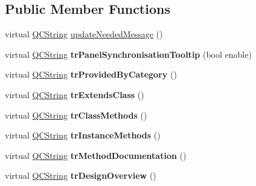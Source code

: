 \subsection*{Public Member Functions}
\begin{DoxyCompactItemize}
\item 
virtual \mbox{\hyperlink{class_q_c_string}{Q\+C\+String}} \mbox{\hyperlink{class_translator_adapter__1__8__2_a307747456f69ab8dcb0c2be27f429e80}{update\+Needed\+Message}} ()
\item 
\mbox{\label{class_translator_adapter__1__8__2_a13608bc1163641d721587d398924f09a}} 
virtual \mbox{\hyperlink{class_q_c_string}{Q\+C\+String}} {\bfseries tr\+Panel\+Synchronisation\+Tooltip} (bool enable)
\item 
\mbox{\label{class_translator_adapter__1__8__2_a0a1548862a686357d6c6efc96aa1c89f}} 
virtual \mbox{\hyperlink{class_q_c_string}{Q\+C\+String}} {\bfseries tr\+Provided\+By\+Category} ()
\item 
\mbox{\label{class_translator_adapter__1__8__2_a474edba60f61b2e307818381df8ec7ee}} 
virtual \mbox{\hyperlink{class_q_c_string}{Q\+C\+String}} {\bfseries tr\+Extends\+Class} ()
\item 
\mbox{\label{class_translator_adapter__1__8__2_a12bfc4603de05d145a7529a3ce9a4ecd}} 
virtual \mbox{\hyperlink{class_q_c_string}{Q\+C\+String}} {\bfseries tr\+Class\+Methods} ()
\item 
\mbox{\label{class_translator_adapter__1__8__2_a45cb32f3ae6bfd259801e40d8b2467b5}} 
virtual \mbox{\hyperlink{class_q_c_string}{Q\+C\+String}} {\bfseries tr\+Instance\+Methods} ()
\item 
\mbox{\label{class_translator_adapter__1__8__2_ac36ebe637cb13898158be0b683485e9c}} 
virtual \mbox{\hyperlink{class_q_c_string}{Q\+C\+String}} {\bfseries tr\+Method\+Documentation} ()
\item 
\mbox{\label{class_translator_adapter__1__8__2_abf6858c813ca8ee242f266e22c227982}} 
virtual \mbox{\hyperlink{class_q_c_string}{Q\+C\+String}} {\bfseries tr\+Design\+Overview} ()
\end{DoxyCompactItemize}
